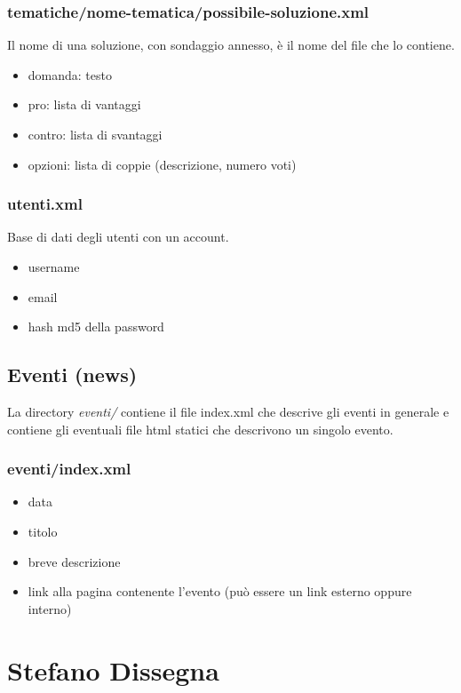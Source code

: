 \documentclass[a4paper,10pt]{article}
\begin{document}
\subsubsection{tematiche/nome-tematica/possibile-soluzione.xml}
Il nome di una soluzione, con sondaggio annesso, \`e il nome del file che lo contiene.
\begin{itemize}
 \item domanda: testo
 \item pro: lista di vantaggi
 \item contro: lista di svantaggi
 \item opzioni: lista di coppie (descrizione, numero voti)
\end{itemize}

\subsubsection{utenti.xml}
Base di dati degli utenti con un account.
\begin{itemize}
 \item username
 \item email
 \item hash md5 della password
\end{itemize}

\subsection{Eventi (news)}
La directory \textit{eventi/} contiene il file index.xml che descrive gli eventi in generale e contiene gli eventuali file html statici che descrivono un singolo evento.
 
\subsubsection{eventi/index.xml}
\begin{itemize}
 \item data 
 \item titolo
 \item breve descrizione
 \item link alla pagina contenente l'evento (pu\`o essere un link esterno oppure interno)
\end{itemize}

\section{Stefano Dissegna}
\end{document}
